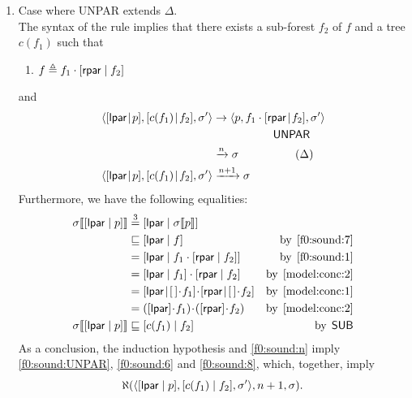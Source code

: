 \begin{enumerate}
\begin{enumerate}
      \item Case where \textsf{UNPAR} extends \(\Delta\).\\ The syntax
        of the rule implies that there exists a sub\hyp{}forest \(f_2\)
        of \(f\) and a tree \(c(f_1)\) such that
        \begin{enumerate}

          \item \label{f0:sound:1} \(f \triangleq f_1 \cdot
            [{\textsf{rpar}}\mid{f_2}]\)

        \end{enumerate}
        and
        \begin{align}
          \match{\cons{c(f_1)\!}{\!f_2}}{\cons{\lpar\!}{\!p}}{\sigma'}
          &\rightarrow
          \match{f_1 \cdot \cons{\rpar\!}{\!f_2}}{p}{\sigma'}
          \notag\\
          & \qquad\qquad\quad\ \textsf{UNPAR} \notag\\
          &\xrightarrow{n} \sigma
          \qquad\qquad\quad(\Delta) \notag\\
          \match{\cons{c(f_1)\!}{\!f_2}}{\cons{\lpar\!}{\!p}}{\sigma'}
          &\xrightarrow{n+1} \sigma \label{f0:sound:UNPAR}
        \end{align}
        Furthermore, we have the following equalities:
        \begin{align}
          \subst{\cons{\lpar}{p}}{\sigma}
          &\eqn{3} \cons{\lpar}{\subst{p}{\sigma}}\notag\\
          &\sqsubseteq \cons{\lpar}{f}
          &\text{by} \,\; \eqref{f0:sound:7}\notag\\
          &= \cons{\lpar}{f_1 \cdot \cons{\rpar}{f_2}}
          &\text{by} \,\; \text{\ref{f0:sound:1}}\notag\\
          &= \cons{\lpar}{f_1} \cdot \cons{\rpar}{f_2}
          &\text{by} \,\; \eqref{model:conc:2}\notag\\
          &= \cons{\lpar\!}{\!\el\!\cdot\!f_1}
             \!\cdot\!\cons{\rpar\!}{\!\el\!\cdot\!f_2}
          &\text{by} \,\; \eqref{model:conc:1}\notag\\
          &= ([\lpar] \!\cdot\! f_1) \!\cdot\! ([\rpar] \!\cdot\! f_2)
          &\text{by} \,\; \eqref{model:conc:2}\notag\\
          \subst{\cons{\lpar}{p}}{\sigma}
          &\sqsubseteq \cons{c(f_1)}{f_2}
          &\text{by} \,\; \textsf{SUB} \label{f0:sound:8}
        \end{align}
        As a conclusion, the induction hypothesis and
        \eqref{f0:sound:n} imply \eqref{f0:sound:UNPAR},
        \eqref{f0:sound:6} and \eqref{f0:sound:8}, which, together,
        imply
        \[\ind{P}(\match{\cons{c(f_1)}{f_2}}{\cons{\lpar}{p}}%
        {\sigma'}, n+1, \sigma).\]


\end{enumerate}
\end{enumerate}

